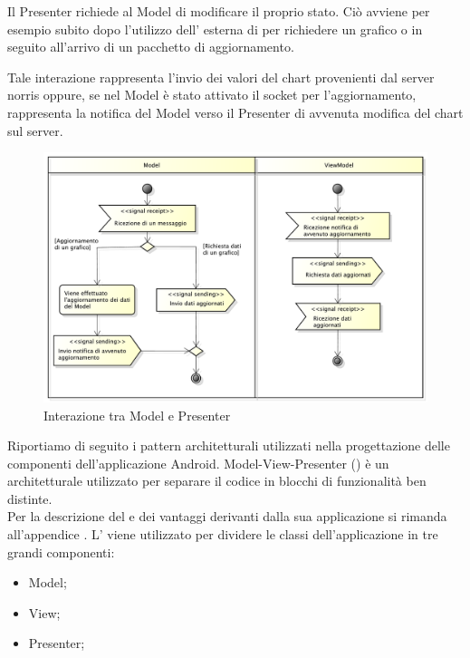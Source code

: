         Il Presenter richiede al Model di modificare il proprio stato. Ciò avviene per esempio subito dopo l'utilizzo dell' esterna di  per richiedere un grafico o in seguito all'arrivo di un pacchetto di aggiornamento.

        Tale interazione rappresenta l'invio dei valori del chart provenienti dal server norris oppure, se nel Model è stato attivato il socket per l'aggiornamento, rappresenta la notifica del Model verso il Presenter di avvenuta modifica del chart sul server.
        
			\begin{figure}[H]\centering
	        		\includegraphics[width=\textwidth]{SpecificaTecnica/Pics/Model-ViewModel}
	        		\caption{Interazione tra Model e Presenter}
	    		\end{figure}
        
    Riportiamo di seguito i pattern architetturali utilizzati nella progettazione delle componenti dell'applicazione Android.
            Model-View-Presenter () è un  architetturale utilizzato per separare il codice in blocchi di funzionalità ben distinte.\\
            Per la descrizione del  e dei vantaggi derivanti dalla sua applicazione si rimanda all'appendice .
                L' viene utilizzato per dividere le classi dell'applicazione  in tre grandi componenti:
                \begin{itemize}
                    \item Model;
                    \item View;
                    \item Presenter;
                \end{itemize}

